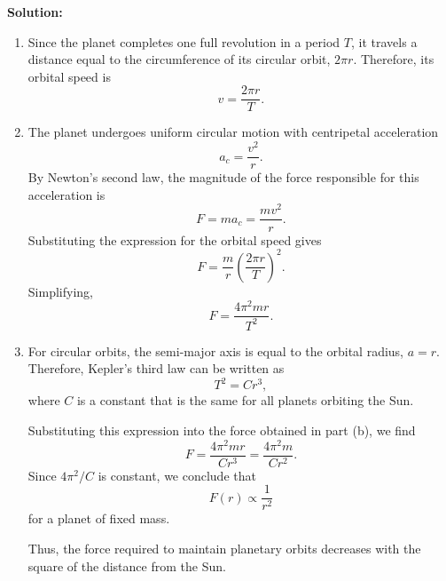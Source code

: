 \documentclass[12pt]{article}
\begin{document}
\textbf{Solution:}

\begin{enumerate}
    \item[(a)] Since the planet completes one full revolution
    in a period $T$, it travels a distance equal to the
    circumference of its circular orbit, $2\pi r$. Therefore,
    its orbital speed is
    \begin{equation}
        \boxed{v=\frac{2\pi r}{T}.}
    \end{equation}

    \item[(b)] The planet undergoes uniform circular motion
    with centripetal acceleration
    \begin{equation}
        a_c=\frac{v^2}{r}.
    \end{equation}
    By Newton's second law, the magnitude of the force
    responsible for this acceleration is
    \begin{equation}
        F=ma_c=\frac{mv^2}{r}.
    \end{equation}
    Substituting the expression for the orbital speed gives
    \begin{equation}
        F=\frac{m}{r}\left(\frac{2\pi r}{T}\right)^2.
    \end{equation}
    Simplifying,
    \begin{equation}
        \boxed{F=\frac{4\pi^2mr}{T^2}.}
    \end{equation}

    \item[(c)] For circular orbits, the semi-major axis is
    equal to the orbital radius, $a=r$. Therefore, Kepler's
    third law can be written as
    \begin{equation}
        T^2=Cr^3,
    \end{equation}
    where $C$ is a constant that is the same for all planets
    orbiting the Sun.

    Substituting this expression into the force obtained in
    part (b), we find
    \begin{equation}
        F=\frac{4\pi^2mr}{Cr^3}
        =\frac{4\pi^2m}{Cr^2}.
    \end{equation}
    Since $4\pi^2/C$ is constant, we conclude that
    \begin{equation}
        \boxed{F(r)\propto\frac{1}{r^2}}
    \end{equation}
    for a planet of fixed mass.

    Thus, the force required to maintain planetary orbits
    decreases with the square of the distance from the Sun.


\end{enumerate}
\end{document}

